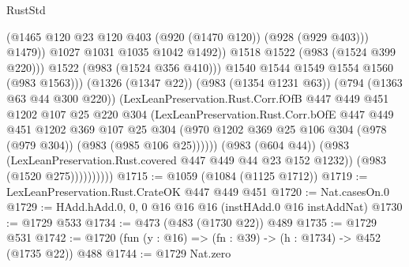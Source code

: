 \begin{lexlean}{RustStd}
\begin{coremodule}
{\begin{coremodule}
{{{{{{                                      (@1465
                                        @120
                                        @23
                                        @120
                                        @403
                                        (@920 (@1470 @120))
                                        (@928 (@929 @403)))
                                      @1479))
                                  @1027
                                  @1031
                                  @1035
                                  @1042
                                  @1492))
                              @1518
                              @1522
                              (@983 (@1524 @399 @220)))
                            @1522
                            (@983 (@1524 @356 @410)))
                          @1540
                          @1544
                          @1549
                          @1554
                          @1560
                          (@983 @1563)))
                      (@1326 (@1347 @22))
                      (@983 (@1354 @1231 @63))
                      (@794 (@1363 @63 @44 @300 @220))
                      (LexLeanPreservation.Rust.Corr.fOfB
                        @447
                        @449
                        @451
                        @1202
                        @107
                        @25
                        @220
                        @304
                        (LexLeanPreservation.Rust.Corr.bOfE
                          @447
                          @449
                          @451
                          @1202
                          @369
                          @107
                          @25
                          @304
                          (@970
                            @1202
                            @369
                            @25
                            @106
                            @304
                            (@978 (@979 @304))
                            (@983 (@985 @106 @25))))))
                    (@983 (@604 @44))
                    (@983 (LexLeanPreservation.Rust.covered @447 @449 @44 @23 @152 @1232))
                    (@983 (@1520 @275))))))))))
@1715 := @1059 (@1084 (@1125 @1712))
@1719 := LexLeanPreservation.Rust.CrateOK @447 @449 @451
@1720 := Nat.casesOn.{0}
@1729 := HAdd.hAdd.{0, 0, 0} @16 @16 @16 (instHAdd.{0} @16 instAddNat)
@1730 := @1729 @533
@1734 := @473 (@483 (@1730 @22)) @489
@1735 := @1729 @531
@1742 := @1720 (fun (y : @16) => (fn : @39) -> (h : @1734) -> @452 (@1735 @22)) @488
@1744 := @1729 Nat.zero
}}}}}}
\end{coremodule}}
\end{coremodule}
\end{lexlean}
